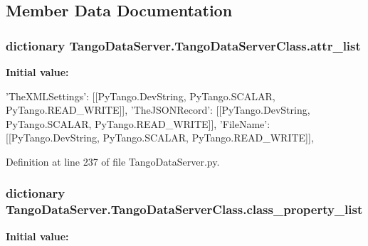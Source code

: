 \subsection{Member Data Documentation}
\hypertarget{classTangoDataServer_1_1TangoDataServerClass_a65e5dd8b961973142ffa5eac9ee33eab}{
\subsubsection[{attr\_\-list}]{\setlength{\rightskip}{0pt plus 5cm}dictionary TangoDataServer.TangoDataServerClass.attr\_\-list}}
\label{classTangoDataServer_1_1TangoDataServerClass_a65e5dd8b961973142ffa5eac9ee33eab}
{\bfseries Initial value:}
\begin{DoxyCode}
{
                'TheXMLSettings':
                        [[PyTango.DevString,
                        PyTango.SCALAR,
                        PyTango.READ_WRITE]],
                'TheJSONRecord':
                        [[PyTango.DevString,
                        PyTango.SCALAR,
                        PyTango.READ_WRITE]],
                'FileName':
                        [[PyTango.DevString,
                        PyTango.SCALAR,
                        PyTango.READ_WRITE]],
                }
\end{DoxyCode}


Definition at line 237 of file TangoDataServer.py.\hypertarget{classTangoDataServer_1_1TangoDataServerClass_ab16f424396e1754535a9b30b59eae7eb}{
\subsubsection[{class\_\-property\_\-list}]{\setlength{\rightskip}{0pt plus 5cm}dictionary TangoDataServer.TangoDataServerClass.class\_\-property\_\-list}}
\label{classTangoDataServer_1_1TangoDataServerClass_ab16f424396e1754535a9b30b59eae7eb}
{\bfseries Initial value:}
\begin{DoxyCode}
{
                }
\end{DoxyCode}


